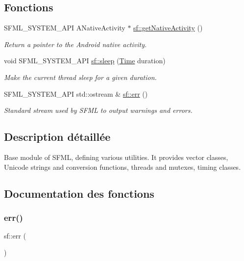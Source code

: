 \subsection*{Fonctions}
\begin{DoxyCompactItemize}
\item 
S\+F\+M\+L\+\_\+\+S\+Y\+S\+T\+E\+M\+\_\+\+A\+PI A\+Native\+Activity $\ast$ \hyperlink{group__system_ga9f5460043bdbd5be0ccccd2e6f0ddc41}{sf\+::get\+Native\+Activity} ()
\begin{DoxyCompactList}\small\item\em Return a pointer to the Android native activity. \end{DoxyCompactList}\item 
void S\+F\+M\+L\+\_\+\+S\+Y\+S\+T\+E\+M\+\_\+\+A\+PI \hyperlink{group__system_ga2f2620831533dee0ed432ed982342e09}{sf\+::sleep} (\hyperlink{classsf_1_1Time}{Time} duration)
\begin{DoxyCompactList}\small\item\em Make the current thread sleep for a given duration. \end{DoxyCompactList}\item 
S\+F\+M\+L\+\_\+\+S\+Y\+S\+T\+E\+M\+\_\+\+A\+PI std\+::ostream \& \hyperlink{group__system_ga7fe7f475639e26334606b5142c29551f}{sf\+::err} ()
\begin{DoxyCompactList}\small\item\em Standard stream used by S\+F\+ML to output warnings and errors. \end{DoxyCompactList}\end{DoxyCompactItemize}


\subsection{Description détaillée}
Base module of S\+F\+ML, defining various utilities. It provides vector classes, Unicode strings and conversion functions, threads and mutexes, timing classes. 

\subsection{Documentation des fonctions}
\mbox{\label{group__system_ga7fe7f475639e26334606b5142c29551f}} 
\subsubsection{\texorpdfstring{err()}{err()}}
{\footnotesize\ttfamily sf\+::err (\begin{DoxyParamCaption}{ }\end{DoxyParamCaption})}



